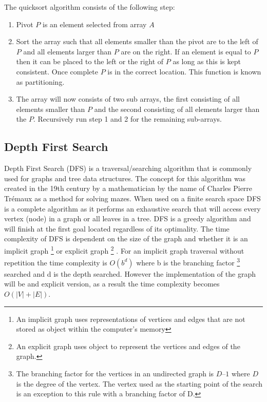 \documentclass{AISB2008}
\begin{document}
The quicksort algorithm consists of the following step:

\begin{enumerate}
\item Pivot {$P$} is an element selected from array {$A$}
\item Sort the array such that all elements smaller than the pivot are to the left of {$P$} and all elements larger than {$P$} are on the right. If an element is equal to {$P$} then it can be placed to the left or the right of {$P$} as long as this is kept consistent. Once complete {$P$} is in the correct location. This function is known as partitioning.
\item The array will now consists of two sub arrays, the first consisting of all elements smaller than {$P$} and the second consisting of all elements larger than the {$P$}. Recursively run step 1 and 2 for the remaining sub-arrays.
\end{enumerate}

\subsection{Depth First Search}

Depth First Search (DFS) is a traversal/searching algorithm that is commonly used for graphs and tree data structures. The concept for this algorithm was created in the 19th century by a mathematician by the name of Charles Pierre Trémaux as a method for solving mazes. When used on a finite search space DFS is a complete algorithm as it performs an exhaustive search that will access every vertex (node) in a graph or all leaves in a tree. DFS is a greedy algorithm and will finish at the first goal located regardless of its optimality. The time complexity of DFS is dependent on the size of the graph and whether it is an implicit graph \footnote{An implicit graph uses representations of vertices and edges that are not stored as object within the computer’s memory}  or explicit graph \footnote{An explicit graph uses object to represent the vertices and edges of the graph.} . For an implicit graph traversal without repetition the time complexity is {$O (b^d)$} where b is the branching factor \footnote{The branching factor for the vertices in an undirected graph is {$D – 1$} where {$D$} is the degree of the vertex. The vertex used as the starting point of the search is an exception to this rule with a branching factor of D.} searched and d is the depth searched. However the implementation of the graph will be and explicit version, as a result the time complexity becomes {$O (|V| + |E|)$}.
\end{document}
